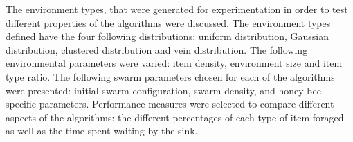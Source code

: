 The environment types, that were generated for experimentation in order to test different properties of the algorithms were discussed. The environment types defined have the four following distributions: uniform distribution, Gaussian distribution, clustered distribution and vein distribution. The following environmental parameters were varied: item density, environment size and item type ratio. The following swarm parameters chosen for each of the algorithms were presented: initial swarm configuration, swarm density, and honey bee specific parameters. Performance measures were selected to compare different aspects of the algorithms: the different percentages of each type of item foraged as well as the time spent waiting by the sink. 

